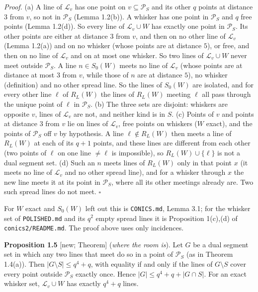 \documentclass[
  10pt,
]{article}
\begin{document}
\emph{Proof.} (a) A line of \(\mathcal L_v\) has one point on
\(v\subseteq\mathcal P_S\) and its other \(q\) points at distance \(3\)
from \(v\), so not in \(\mathcal P_S\) (Lemma 1.2(b)). A whisker has one
point in \(\mathcal P_S\) and \(q\) free points (Lemma 1.2(d)). So every
line of \(\mathcal L_v\cup W\) has exactly one point in
\(\mathcal P_S\). Its other points are either at distance \(3\) from
\(v\), and then on no other line of \(\mathcal L_v\) (Lemma 1.2(a)) and
on no whisker (whose points are at distance \(5\)), or free, and then on
no line of \(\mathcal L_v\) and on at most one whisker. So two lines of
\(\mathcal L_v\cup W\) never meet outside \(\mathcal P_S\). A line
\(n\in S_0(W)\) meets no line of \(\mathcal L_v\) (whose points are at
distance at most \(3\) from \(v\), while those of \(n\) are at distance
\(5\)), no whisker (definition) and no other spread line. So the lines
of \(S_0(W)\) are isolated, and for every other line \(\ell\) of
\(R_L(W)\) the lines of \(R_L(W)\) meeting \(\ell\) all pass through the
unique point of \(\ell\) in \(\mathcal P_S\). (b) The three sets are
disjoint: whiskers are opposite \(v\), lines of \(\mathcal L_v\) are
not, and neither kind is in \(S\). (c) Points of \(v\) and points at
distance \(3\) from \(v\) lie on lines of \(\mathcal L_v\), free points
on whiskers (\(W\) exact), and the points of \(\mathcal P_S\) off \(v\)
by hypothesis. A line \(\ell\notin R_L(W)\) then meets a line of
\(R_L(W)\) at each of its \(q+1\) points, and these lines are different
from each other (two points of \(\ell\) on one line \(\ne\ell\) is
impossible), so \(R_L(W)\cup\{\ell\}\) is not a dual segment set. (d)
Such an \(n\) meets lines of \(R_L(W)\) only in that point \(x\) (it
meets no line of \(\mathcal L_v\) and no other spread line), and for a
whisker through \(x\) the new line meets it at its point in
\(\mathcal P_S\), where all its other meetings already are. Two such
spread lines do not meet. \(\square\)

For \(W\) exact and \(S_0(W)\) left out this is \texttt{CONICS.md},
Lemma 3.1; for the whisker set of \texttt{POLISHED.md} and its \(q^2\)
empty spread lines it is Proposition 1(c),(d) of
\texttt{conics2/README.md}. The proof above uses only incidences.

\textbf{Proposition 1.5} {[}new; Theorem{]} (\emph{where the room is}).
Let \(G\) be a dual segment set in which any two lines that meet do so
in a point of \(\mathcal P_S\) (as in Theorem 1.4(a)). Then
\(|G\setminus S|\le q^4+q\), with equality if and only if the lines of
\(G\setminus S\) cover every point outside \(\mathcal P_S\) exactly
once. Hence \(|G|\le q^4+q+|G\cap S|\). For an exact whisker set,
\(\mathcal L_v\cup W\) has exactly \(q^4+q\) lines.
\end{document}
